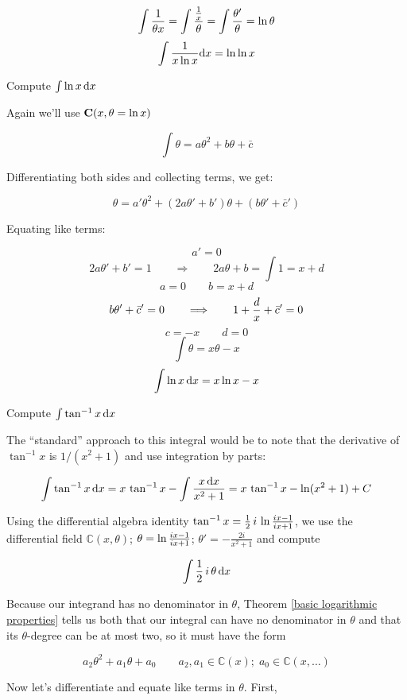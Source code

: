 $$\int {1\over{\theta x}} = \int {{1\over x}\over{\theta}} = \int {{\theta '}\over{\theta}} = \ln \theta$$
$$\int {1\over{x \ln x}} {\rm d}x = \ln \ln x$$

\endexample

\example Compute $\int \ln x \,{\rm d}x$

Again we'll use ${\bf C}(x, \theta = \ln x)$

$$\int \theta = a\theta^2 + b\theta + \bar{c}$$

Differentiating both sides and collecting terms, we get:

$$\theta = a'\theta^2 + (2a\theta' + b')\theta + (b\theta' + \bar{c}')$$

Equating like terms:

$$a' = 0$$
$$2a\theta' + b' = 1 \qquad\Longrightarrow\qquad 2a\theta + b = \int 1 = x + d$$
$$a = 0 \qquad b=x+d$$
$$b\theta' + \bar{c}' = 0 \qquad\Longrightarrow\qquad 1 + {d\over x} + \bar{c}' = 0$$
$$c = -x \qquad d = 0$$
$$\int \theta = x\theta - x$$
$$\int \ln x \,{\rm d}x = x \ln x - x$$

\endexample

\vfill\eject

\example Compute $\int \tan^{-1} x\, {\rm d}x$

The ``standard'' approach to this integral would be to note that the
derivative of $\tan^{-1} x$ is $1/(x^2+1)$ and use integration by parts:

$$\int \tan^{-1} x\, {\rm d}x = x\, \tan^{-1}x - \int \frac{x\, {\rm d}x}{x^2+1}
= x\, \tan^{-1}x - \ln(x^2+1) + C$$

Using the differential algebra identity $\tan^{-1} x =
{1\over2}\,i\,\ln {{ix-1}\over{ix+1}}$, we use the differential field
${\mathbb C}(x,\theta)$; $\theta = \ln {{ix-1}\over{ix+1}}$;
$\theta' = - \frac{2i}{x^2+1}$ and compute


$$\int {1\over2}\,i\,\theta\, {\rm d}x$$

Because our integrand has no denominator in $\theta$, Theorem
\ref{basic logarithmic properties} tells us both that our
integral can have no denominator in $\theta$ and that its
$\theta$-degree can be at most two, so it must have the form

$$a_2\theta^2 + a_1\theta + a_0\qquad a_2,a_1 \in {\mathbb C}(x);\;
a_0 \in {\mathbb C}(x,\ldots)$$

Now let's differentiate and equate like terms in $\theta$.  First,

